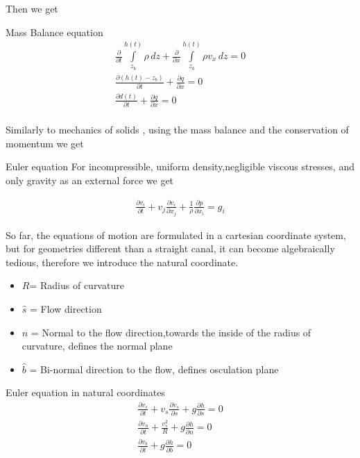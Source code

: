 \documentclass[a4paper, 11pt,article,oneside]{memoir}%
\begin{document}
Then we get 
\begin{eqbox2}{}{Mass Balance equation}
\begin{gather*}
\frac{\partial}{\partial t} \int\limits _{z_b}^{h(t)} \rho\, dz+\frac{\partial}{\partial x}\int\limits_{z_b}^{h(t)} \rho v_x \,dz= 0\\
\frac{\partial (h(t)-z_b)}{\partial t}+\frac{\partial q}{\partial x}=0\\
\frac{\partial d(t)}{\partial t}+\frac{\partial q}{\partial x}=0\\
\end{gather*}
\end{eqbox2}
Similarly to mechanics of solids , using  the mass balance and the conservation of momentum we get 
\begin{eqbox2}{}{Euler equation}
For incompressible, uniform density,negligible viscous stresses, and only gravity as an external force we get 

\begin{align*}
\frac{\partial v_i}{\partial t}+v_j\frac{\partial v_i}{\partial x_j}+\frac{1}{\rho}\frac{\partial p}{\partial x_i}=g_i
\end{align*}
\end{eqbox2}
So far, the equations of motion are formulated in a cartesian coordinate system, but for geometries different  than a straight canal, it can become algebraically tedious, therefore we introduce the natural coordinate.
\begin{itemize}[]
\item $R$= Radius of curvature
\item $\hat{s} $ = Flow direction
\item $\hat{n} $ = Normal to the flow direction,towards the inside of the radius of curvature, defines the normal plane 
\item $\hat{b} $ = Bi-normal direction to the flow, defines osculation plane
\end{itemize}

\begin{eqbox2}{}{Euler equation in natural coordinates}
\begin{gather*}
\frac{\partial v_s}{\partial t}+v_s\frac{\partial v_s}{\partial s}+g\frac{\partial h}{\partial s}=0\\
\frac{\partial v_n}{\partial t}+\frac{v_s^2}{R}+g\frac{\partial h}{\partial n}=0\\
\frac{\partial v_b}{\partial t}+g\frac{\partial h}{\partial b}=0
\end{gather*}
\end{eqbox2}
\end{document}
